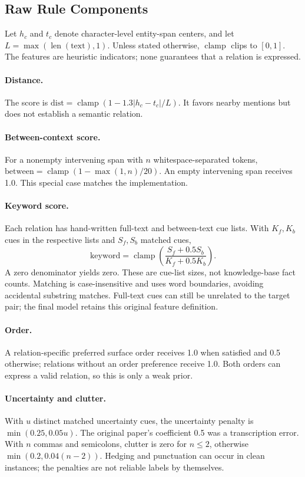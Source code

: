 \documentclass[11pt]{article}
\begin{document}
\subsection{Raw Rule Components}
Let $h_c$ and $t_c$ denote character-level entity-span centers, and let $L=\max(\operatorname{len}(\mathrm{text}),1)$. Unless stated otherwise, $\operatorname{clamp}$ clips to $[0,1]$. The features are heuristic indicators; none guarantees that a relation is expressed.

\paragraph{Distance.}
The score is $\mathrm{dist}=\operatorname{clamp}(1-1.3|h_c-t_c|/L)$. It favors nearby mentions but does not establish a semantic relation.

\paragraph{Between-context score.}
For a nonempty intervening span with $n$ whitespace-separated tokens, $\mathrm{between}=\operatorname{clamp}(1-\max(1,n)/20)$. An empty intervening span receives 1.0. This special case matches the implementation.

\paragraph{Keyword score.}
Each relation has hand-written full-text and between-text cue lists. With $K_f,K_b$ cues in the respective lists and $S_f,S_b$ matched cues,
\[
\mathrm{keyword}=\operatorname{clamp}\left(\frac{S_f+0.5S_b}{K_f+0.5K_b}\right).
\]
A zero denominator yields zero. These are cue-list sizes, not knowledge-base fact counts. Matching is case-insensitive and uses word boundaries, avoiding accidental substring matches. Full-text cues can still be unrelated to the target pair; the final model retains this original feature definition.

\paragraph{Order.}
A relation-specific preferred surface order receives 1.0 when satisfied and 0.5 otherwise; relations without an order preference receive 1.0. Both orders can express a valid relation, so this is only a weak prior.

\paragraph{Uncertainty and clutter.}
With $u$ distinct matched uncertainty cues, the uncertainty penalty is $\min(0.25,0.05u)$. The original paper's coefficient 0.5 was a transcription error. With $n$ commas and semicolons, clutter is zero for $n\leq2$, otherwise $\min(0.2,0.04(n-2))$. Hedging and punctuation can occur in clean instances; the penalties are not reliable labels by themselves.
\end{document}
